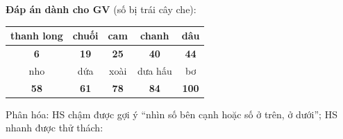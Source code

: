 \documentclass[../main.tex]{subfiles}
\begin{document}
\begin{luuy}
    \textbf{Đáp án dành cho GV} (số bị trái cây che):
    \par\smallskip
    \centering
    \renewcommand{\arraystretch}{1.25}
    \begin{tabular}{|c|c|c|c|c|}
        \hline
        thanh long & chuối & cam & chanh & dâu \\ \hline
        \textbf{6} & \textbf{19} & \textbf{25} & \textbf{40} & \textbf{44} \\ \hline
        nho & dứa & xoài & dưa hấu & bơ \\ \hline
        \textbf{58} & \textbf{61} & \textbf{78} & \textbf{84} & \textbf{100} \\ \hline
    \end{tabular}
    \par\smallskip
    \raggedright
    Phân hóa: HS chậm được gợi ý “nhìn số bên cạnh hoặc số ở trên, ở dưới”; HS nhanh được thử thách: 
\end{luuy}

\end{document}

